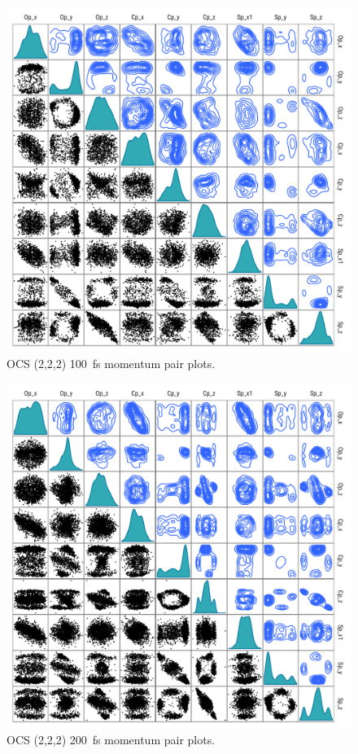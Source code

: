\begin{figure}
  \centering
  \includegraphics[width=\textwidth]{Plots/OCS222100fsMomentumPairPlots}
  \caption[OCS (2,2,2) \SI{100}{\fs} momentum pair plots.]
  {OCS (2,2,2) \SI{100}{\fs} momentum pair plots.}
  \label{fig:OCS222100fsMomentumPairPlots}
\end{figure}

\begin{figure}
  \centering
  \includegraphics[width=\textwidth]{Plots/OCS222200fsMomentumPairPlots}
  \caption[OCS (2,2,2) \SI{200}{\fs} momentum pair plots.]
  {OCS (2,2,2) \SI{200}{\fs} momentum pair plots.}
  \label{fig:OCS222200fsMomentumPairPlots}
\end{figure}

